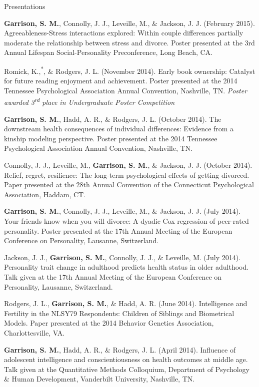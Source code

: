 \documentclass {resume}
\newlength{\wideitemsep}
\let\olditem\item
\renewcommand{\item}{\setlength{\itemsep}{\wideitemsep}\olditem}
\newcommand{\meb}{{\bf Garrison, S. M.}\xspace}
\newcommand{\student}{\hspace{-3.95pt}\textsuperscript{*}\hspace* {2 pt}}
\begin{document}
\begin{rSection}{\textrm{Presentations}}
\begin{etaremune}
\item\meb, Connolly, J. J., Leveille, M., \& Jackson, J. J. (February 2015). Agreeableness-Stress interactions explored: Within couple differences partially moderate the relationship between stress and divorce. Poster presented at the 3rd Annual Lifespan Social-Personality Preconference, Long Beach, CA.
\item Romick, K.,\student \meb, \& Rodgers, J. L. (November 2014). Early book ownership: Catalyst for future reading enjoyment and achievement. Poster presented at the 2014 Tennessee Psychological Association Annual Convention, Nashville, TN. \textit{Poster awarded 3\textsuperscript{rd} place in Undergraduate Poster Competition}
\item\meb, Hadd, A. R., \& Rodgers, J. L. (October 2014). The downstream health consequences of individual differences: Evidence from a kinship modeling perspective. Poster presented at the 2014 Tennessee Psychological Association Annual Convention, Nashville, TN.
\item Connolly, J. J., Leveille, M., \meb, \& Jackson, J. J. (October 2014). Relief,  regret,  resilience: The  long-term  psychological  effects  of  getting divorced. Paper presented at the 28th Annual Convention of the Connecticut Psychological Association, Haddam, CT.
\item\meb, Connolly, J. J., Leveille, M., \& Jackson, J. J. (July 2014). Your friends know when you will divorce: A dyadic Cox regression of peer-rated personality. Poster presented at the 17th Annual Meeting of the European Conference on Personality, Lausanne, Switzerland.
\item Jackson, J. J., \meb, Connolly, J. J., \& Leveille, M. (July 2014). Personality trait change in adulthood predicts health status in older adulthood. Talk given at the 17th Annual Meeting of the European Conference on Personality, Lausanne, Switzerland.
\item Rodgers, J. L., \meb, \& Hadd, A. R. (June 2014). Intelligence and Fertility in the NLSY79 Respondents: Children of Siblings and Biometrical Models. Paper presented at the 2014 Behavior Genetics Association, Charlottesville, VA. 
\pagestyle{myheadings}
\item\meb, Hadd, A. R., \& Rodgers, J. L. (April 2014). Influence of adolescent intelligence and conscientiousness on health outcomes at middle age. Talk given at the Quantitative Methods Colloquium, Department of Psychology \& Human Development, Vanderbilt University, Nashville, TN.

\end{etaremune}
\end{rSection}
\end{document}
